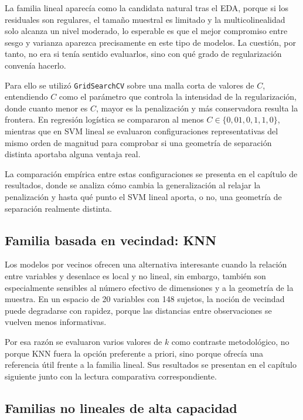 La familia lineal aparecía como la candidata natural tras el EDA, porque si los residuales son regulares, el tamaño
muestral es limitado y la multicolinealidad solo alcanza un nivel moderado, lo esperable es que el mejor compromiso entre
sesgo y varianza aparezca precisamente en este tipo de modelos. La cuestión, por tanto, no era si tenía sentido
evaluarlos, sino con qué grado de regularización convenía hacerlo.

Para ello se utilizó \texttt{GridSearchCV} sobre una malla corta de valores de $C$, entendiendo $C$ como el parámetro que
controla la intensidad de la regularización, donde cuanto menor es $C$, mayor es la penalización y más conservadora
resulta la frontera. En regresión logística se compararon al menos $C \in \{0{,}01, 0{,}1, 1{,}0\}$, mientras que en SVM
lineal se evaluaron configuraciones representativas del mismo orden de magnitud para comprobar si una geometría de
separación distinta aportaba alguna ventaja real.

La comparación empírica entre estas configuraciones se presenta en el capítulo de resultados, donde se analiza cómo
cambia la generalización al relajar la penalización y hasta qué punto el SVM lineal aporta, o no, una geometría de
separación realmente distinta.

\subsection{Familia basada en vecindad: KNN}

Los modelos por vecinos ofrecen una alternativa interesante cuando la relación entre variables y desenlace es local y no
lineal, sin embargo, también son especialmente sensibles al número efectivo de dimensiones y a la geometría de la
muestra. En un espacio de 20 variables con 148 sujetos, la noción de vecindad puede degradarse con rapidez, porque las
distancias entre observaciones se vuelven menos informativas.

Por esa razón se evaluaron varios valores de $k$ como contraste metodológico, no porque KNN fuera la opción preferente a
priori, sino porque ofrecía una referencia útil frente a la familia lineal. Sus resultados se presentan en el capítulo
siguiente junto con la lectura comparativa correspondiente.

\subsection{Familias no lineales de alta capacidad}

